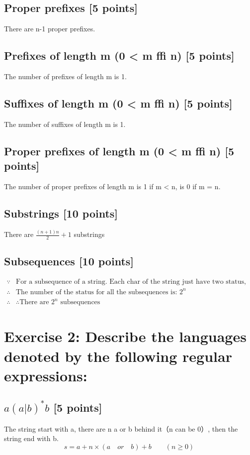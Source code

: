 \documentclass{article}
\begin{document}
        \subsection{Proper prefixes [5 points]}
        There are n-1 proper prefixes.
        \subsection{Prefixes of length m (0 < m ffi n) [5 points]}
        The number of prefixes of length m is 1.
        \subsection{Suffixes of length m (0 < m ffi n) [5 points]}
        The number of suffixes of length m is 1.
        \subsection{Proper prefixes of length m (0 < m ffi n) [5 points]}
        The number of proper prefixes of length m is 1 if m < n, is 0 if m = n.
        \subsection{Substrings [10 points]}
        There are $\frac{(n+1)n}{2} + 1$ substrings
        \subsection{Subsequences [10 points]}
        \begin{align*}
            \because &\text{For a subsequence of a string. Each char of the string just have two status, in the sequence or not in it.}\\
            \therefore &\text{The number of the status for all the subsequences is: } 2^n\\
            \therefore &\text{∴There are } 2^n \text{ subsequences}
        \end{align*}
    \section{Exercise 2: Describe the languages denoted by the following regular expressions:}
        \subsection{$a(a|b)^*b$ [5 points]}
            The string start with a, there are n a or b behind it（n can be 0）, then the string end with b.
            $$s = a + n × (a\quad or\quad b) + b\qquad (n\geq 0)$$
\end{document}
